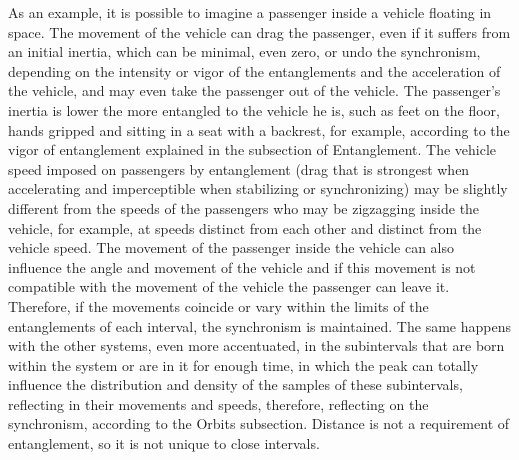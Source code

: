 As an example, it is possible to imagine a passenger inside a vehicle floating in space. The movement of the vehicle can drag the passenger, even if it suffers from an initial inertia, which can be minimal, even zero, or undo the synchronism, depending on the intensity or vigor of the entanglements and the acceleration of the vehicle, and may even take the passenger out of the vehicle. The passenger's inertia is lower the more entangled to the vehicle he is, such as feet on the floor, hands gripped and sitting in a seat with a backrest, for example, according to the vigor of entanglement explained in the subsection of Entanglement. The vehicle speed imposed on passengers by entanglement (drag that is strongest when accelerating and imperceptible when stabilizing or synchronizing) may be slightly different from the speeds of the passengers who may be zigzagging inside the vehicle, for example, at speeds distinct from each other and distinct from the vehicle speed. The movement of the passenger inside the vehicle can also influence the angle and movement of the vehicle and if this movement is not compatible with the movement of the vehicle the passenger can leave it. Therefore, if the movements coincide or vary within the limits of the entanglements of each interval, the synchronism is maintained. The same happens with the other systems, even more accentuated, in the subintervals that are born within the system or are in it for enough time, in which the peak can totally influence the distribution and density of the samples of these subintervals, reflecting in their movements and speeds, therefore, reflecting on the synchronism, according to the Orbits subsection. Distance is not a requirement of entanglement, so it is not unique to close intervals.

